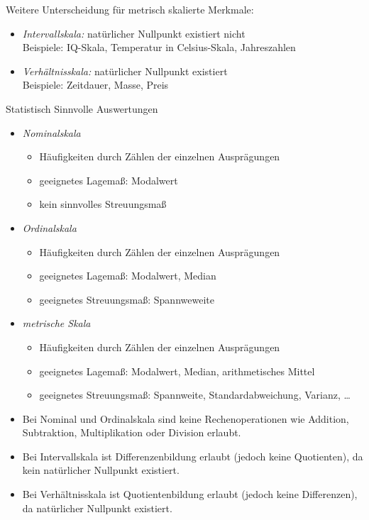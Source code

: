\documentclass{scrreprt}
\begin{document}
\begin{enumerate}[label=(\Alph*)]
\begin{itemize}
Weitere Unterscheidung für metrisch skalierte Merkmale:
\begin{itemize}
\item \emph{Intervallskala:} natürlicher Nullpunkt existiert nicht\\
Beispiele: IQ-Skala, Temperatur in Celsius-Skala, Jahreszahlen
\item \emph{Verhältnisskala:} natürlicher Nullpunkt existiert\\
Beispiele: Zeitdauer, Masse, Preis
\end{itemize}
\end{itemize}
\end{enumerate}

 Statistisch Sinnvolle Auswertungen
\begin{itemize}
\item \emph{Nominalskala}
\begin{itemize}
\item Häufigkeiten durch Zählen der einzelnen Ausprägungen
\item geeignetes Lagemaß: Modalwert
\item kein sinnvolles Streuungsmaß
\end{itemize}
\item \emph{Ordinalskala}
\begin{itemize}
\item Häufigkeiten durch Zählen der einzelnen Ausprägungen
\item geeignetes Lagemaß: Modalwert, Median
\item geeignetes Streuungsmaß: Spannweweite
\end{itemize}
\item \emph{metrische Skala}
\begin{itemize}
\item Häufigkeiten durch Zählen der einzelnen Ausprägungen
\item geeignetes Lagemaß: Modalwert, Median, arithmetisches Mittel
\item geeignetes Streuungsmaß: Spannweite, Standardabweichung, Varianz, …
\end{itemize}
\end{itemize}

\begin{itemize}
\item Bei Nominal und Ordinalskala sind keine Rechenoperationen wie Addition, Subtraktion, Multiplikation oder Division erlaubt.
\item Bei Intervallskala ist Differenzenbildung erlaubt (jedoch keine Quotienten), da kein natürlicher Nullpunkt existiert.
\item Bei Verhältnisskala ist Quotientenbildung erlaubt (jedoch keine Differenzen), da natürlicher Nullpunkt existiert.
\end{itemize}
\end{document}
